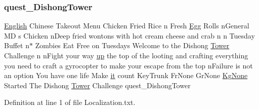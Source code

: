 \subsubsection{\texorpdfstring{quest\_DishongTower}{quest\_DishongTower}}
{\footnotesize\ttfamily \mbox{\hyperlink{_sphere_i_i_01_winter_01_project_2_config_2_localization_8txt_ad896b63205779b1b09e86d941ce13976}{English}} Chinese Takeout Menu Chicken Fried Rice n Fresh \mbox{\hyperlink{_sphere_i_i_01_winter_01_project_2_config_2_localization_8txt_a55334ab0b48a68a93004334728020f15}{Egg}} Rolls n\+General MD s Chicken n\+Deep fried wontons with hot cream cheese and crab n n Tuesday Buffet n$\ast$ Zombies Eat Free on Tuesdays Welcome to the Dishong \mbox{\hyperlink{_dishong_01_tower_01_challenge_2_config_2_localization_8txt_ad03a7286db82f171f8e82a1eaf4e3eaf}{Tower}} Challenge n n\+Fight your way \mbox{\hyperlink{_the_01_restless_01_curse_2_config_2_localization_01-_01_quest_8txt_a2f8d5a9cc6c08e259de10d34d28f85c4}{up}} the top of the looting and crafting everything you need to craft a gyrocopter to make your escape from the top n\+Failure is not an option You have one life Make \mbox{\hyperlink{_the_01_restless_01_curse_2_config_2_localization_01-_01_quest_8txt_a741b285909bea4855b886664c2dcd50c}{it}} count Key\+Trunk Fr\+None Gr\+None \mbox{\hyperlink{_the_01_restless_01_curse_2_config_2_localization_8txt_acc1c43e0980c5828bcfaf85313744919}{Kg\+None}} Started The Dishong \mbox{\hyperlink{_dishong_01_tower_01_challenge_2_config_2_localization_8txt_ad03a7286db82f171f8e82a1eaf4e3eaf}{Tower}} Challenge quest\+\_\+\+Dishong\+Tower}



Definition at line 1 of file Localization.\+txt.

\mbox{\label{_dishong_01_tower_01_challenge_2_config_2_localization_8txt_a8980a0a7c5a5e5c6bdc3d809bfd0f221}} 
